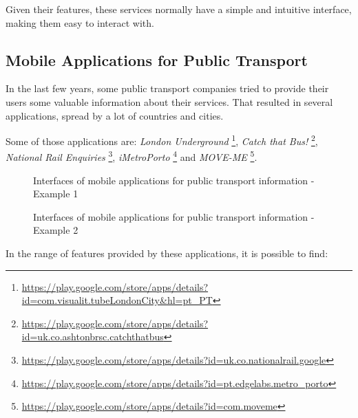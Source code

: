 Given their features, these services normally have a simple and intuitive interface, making them easy to interact with.

\subsection{Mobile Applications for Public Transport}

In the last few years, some public transport companies tried to provide their users some valuable information about their services. That resulted in several applications, spread by a lot of countries and cities.

Some of those applications are: \emph{London Underground} \footnote{\url{https://play.google.com/store/apps/details?id=com.visualit.tubeLondonCity&hl=pt_PT}}, \emph{Catch that Bus!} \footnote{\url{https://play.google.com/store/apps/details?id=uk.co.ashtonbrsc.catchthatbus}}, \emph{National Rail Enquiries} \footnote{\url{https://play.google.com/store/apps/details?id=uk.co.nationalrail.google}}, \emph{iMetroPorto} \footnote{\url{https://play.google.com/store/apps/details?id=pt.edgelabs.metro_porto}} and \emph{MOVE-ME} \footnote{\url{https://play.google.com/store/apps/details?id=com.moveme}}.

\begin{figure}[h]
\begin{center}
\leavevmode
{} \hspace{1em}%
\caption{Interfaces of mobile applications for public transport information - Example 1}
\label{fig:interfaces1}
\end{center}
\end{figure}

\begin{figure}[h]
\begin{center}
\leavevmode
{} \hspace{1em}%
\caption{Interfaces of mobile applications for public transport information - Example 2}
\label{fig:interfaces2}
\end{center}
\end{figure}



In the range of features provided by these applications, it is possible to find: 

